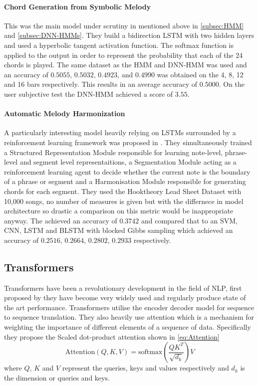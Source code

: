\paragraph{Chord Generation from Symbolic Melody} This was the main model under scrutiny in \cite{BLSTM} mentioned above in \ref{subsec:HMM} and \ref{subsec:DNN-HMMs}.
They build a bidirection LSTM with two hidden layers and used a hyperbolic tangent activation function. The softmax function is applied to the output in order to represent the probability that each of the 24 chords is played.
The same dataset as the HMM and DNN-HMM was used and an accuracy of $0.5055$, $0.5032$, $0.4923$, and $0.4990$  was obtained on the 4, 8, 12 and 16 bars respectively. This results in an average accuracy of $0.5000$.
On the user subjective test the DNN-HMM achieved a score of $3.55$.

\paragraph{Automatic Melody Harmonization} A particularly interesting model heavily relying on LSTMs surrounded by a reinforcement learning framework was proposed in \cite{ReinforcementLearning}.
They simultaneously trained a Structured Representation Module responsible for learning note-level, phrase-level and segment level representaitions, a Segmentation Module acting as a reinforcement learning agent to decide whether the current note is the boundary of a phrase or segment and a Harmonisation Module responsible for generating chords for each segment.
They used the Hooktheory Lead Sheet Dataset with 10,000 songs, no number of measures is given but with the differnece in model architecture so drastic a comparison on this metric would be inappropriate anyway.
The achieved an accuracy of $0.3742$ and compared that to an SVM, CNN, LSTM and BLSTM with blocked Gibbs sampling which achieved an accuracy of $0.2516$, $0.2664$, $0.2802$, $0.2933$ respectively.

\subsection{Transformers}

Transformers have been a revolutionary development in the field of NLP, first proposed by \cite{Transformers} they have become very widely used and regularly produce state of the art performance.
Transformers utilise the encoder decoder model for sequence to sequence translation.
They also heavily use attention which is a mechanism for weighting the importance of different elements of a sequence of data.
Specifically they propose the Scaled dot-product attention shown in \ref{eq:Attention}
\begin{equation}
    \text{Attention}(Q,K,V) = \text{softmax}(\frac{QK^T}{\sqrt{d_k}})V
    \label{eq:Attention}
\end{equation}
where $Q$, $K$ and $V$ represent the queries, keys and values respectively and $d_k$ is the dimension or queries and keys.

